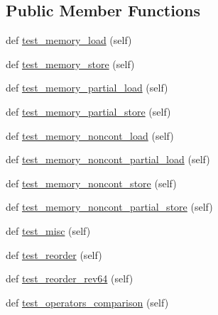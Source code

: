 \subsection*{Public Member Functions}
\begin{DoxyCompactItemize}
\item 
def \hyperlink{classnumpy_1_1core_1_1tests_1_1test__simd_1_1__SIMD__ALL_a9b9f55aeddb340ab52d3dd2133ee3daf}{test\+\_\+memory\+\_\+load} (self)
\item 
def \hyperlink{classnumpy_1_1core_1_1tests_1_1test__simd_1_1__SIMD__ALL_a5bf6179e8a2fed8112c950cdb21fce07}{test\+\_\+memory\+\_\+store} (self)
\item 
def \hyperlink{classnumpy_1_1core_1_1tests_1_1test__simd_1_1__SIMD__ALL_a6ebe6c6325572b569369c6dafa633473}{test\+\_\+memory\+\_\+partial\+\_\+load} (self)
\item 
def \hyperlink{classnumpy_1_1core_1_1tests_1_1test__simd_1_1__SIMD__ALL_aac878c4e840d311b7875d6faee55e94d}{test\+\_\+memory\+\_\+partial\+\_\+store} (self)
\item 
def \hyperlink{classnumpy_1_1core_1_1tests_1_1test__simd_1_1__SIMD__ALL_aca55933d4cd6de3f48a0794eaf34efe2}{test\+\_\+memory\+\_\+noncont\+\_\+load} (self)
\item 
def \hyperlink{classnumpy_1_1core_1_1tests_1_1test__simd_1_1__SIMD__ALL_a7d5561924ce08d81bfaba0e9553253a8}{test\+\_\+memory\+\_\+noncont\+\_\+partial\+\_\+load} (self)
\item 
def \hyperlink{classnumpy_1_1core_1_1tests_1_1test__simd_1_1__SIMD__ALL_ade35386ccd4a661d607a4330e0940948}{test\+\_\+memory\+\_\+noncont\+\_\+store} (self)
\item 
def \hyperlink{classnumpy_1_1core_1_1tests_1_1test__simd_1_1__SIMD__ALL_a4bc498cb20671487caf7a93b633609ce}{test\+\_\+memory\+\_\+noncont\+\_\+partial\+\_\+store} (self)
\item 
def \hyperlink{classnumpy_1_1core_1_1tests_1_1test__simd_1_1__SIMD__ALL_ac43e13b531efb40e13f0471ca8bc52e0}{test\+\_\+misc} (self)
\item 
def \hyperlink{classnumpy_1_1core_1_1tests_1_1test__simd_1_1__SIMD__ALL_ab452f822fc643f602fa78ec7eabe7b45}{test\+\_\+reorder} (self)
\item 
def \hyperlink{classnumpy_1_1core_1_1tests_1_1test__simd_1_1__SIMD__ALL_a23d8f4966b4e55a0a52975d15d11b40d}{test\+\_\+reorder\+\_\+rev64} (self)
\item 
def \hyperlink{classnumpy_1_1core_1_1tests_1_1test__simd_1_1__SIMD__ALL_ae210ffda304097086041399b6f3ee8b7}{test\+\_\+operators\+\_\+comparison} (self)

\end{DoxyCompactItemize}
